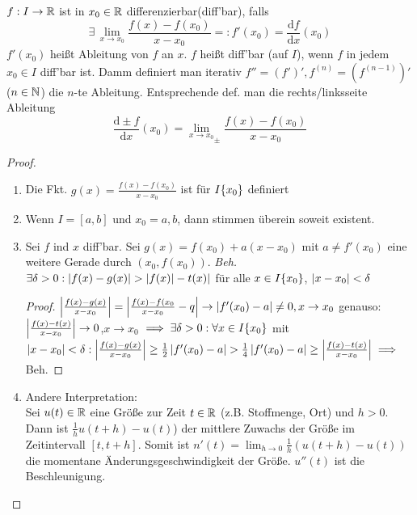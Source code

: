 \documentclass[12pt]{scrreprt}
\begin{document}
\begin{dfn}\label{dfn:diff.rechenregeln.diffbar} $f: I \rightarrow \mathbb{R}$ ist in $x_0 \in \mathbb{R}$ differenzierbar(diff'bar), falls
\begin{equation}\label{}
\exists\,\lim_{x\to x_0} \frac{f(x) - f(x_0)}{x-x_0} =: f'(x_0) = \frac{\mathrm{d} f}{\mathrm{d} x}(x_0) 
\end{equation}
$f'(x_0)$ heißt Ableitung von $f$ an $x$. $f$ heißt diff'bar (auf $I$), wenn $f$ in jedem $x_0 \in I$ diff'bar ist. Damm definiert man
iterativ $f'' = (f')', f^(n) = (f^(n-1))'$ ($n \in \mathbb{N}$) die $n$-te Ableitung.
Entsprechende def. man die rechts/linksseite Ableitung
\begin{equation}
\frac{\mathrm{d} \pm f}{\mathrm{d} x}(x_0) = {\lim_{x\to x_0}}_\pm \frac{f(x) - f(x_0)}{x-x_0}
\end{equation}
\end{dfn}

\begin{proof}
\begin{enumerate}
\item Die Fkt. $g(x) = \frac{f(x) - f(x_0)}{x-x_0}$ ist für $I\\\{x_0\}$ definiert
\item Wenn $I=[a,b]$ und $x_0=a,b$, dann stimmen %
überein soweit existent.
\item Sei $f$ ind $x$ diff'bar. Sei $g(x) = f(x_0) + a(x-x_0)$ mit $a \ne f'(x_0)$ eine weitere Gerade durch
$(x_0, f(x_0))$. \emph{Beh.} $\exists \delta > 0: \left\lvert f(x) - g(x)\right\lvert > \left\lvert f(x)\right\lvert-t(x)|$ für alle 
$x \in I\\\{x_0\} $, $\left\lvert x-x_0\right\lvert < \delta$
\begin{proof}
$\left\lvert\frac{f(x) - g(x)}{x-x_0}\right\lvert = \left\lvert\frac{f(x)-f(x_0}{x-x_0} - q\right\lvert \to \left\lvert f'(x_0)-a\right\lvert \ne 0, x\to x_0$
genauso: $\left\lvert\frac{f(x)-t(x)}{x-x_0}\right\lvert \to 0$,$x\to x_0$
$\implies \exists\delta>0:\forall x\in I\\\{x_0\}$ mit $\left\lvert x-x_0\right\lvert < \delta:\left\lvert\frac{f(x)-g(x)}{x-x_0}\right\lvert\ge
\frac{1}{2}\left\lvert f'(x_0) -a\right\lvert > \frac{1}{4}\left\lvert f'(x_0)-a\right\lvert\ge\left\lvert\frac{f(x)-t(x)}{x-x_0}\right\lvert \implies$ Beh.
\end{proof}
\item Andere Interpretation:\\
Sei $u(t) \in \mathbb{R}$ eine Größe zur Zeit $t\in\mathbb{R}$ (z.B. Stoffmenge, Ort) und $h>0$.
Dann ist $\frac{1}{h}u(t+h) - u(t)$) der mittlere Zuwachs der Größe im Zeitintervall $[t, t+h]$. Somit ist
$n'(t) = \lim_{h\to 0}\frac{1}{h}(u(t+h)-u(t))$ die momentane Änderungsgeschwindigkeit der Größe. $u''(t)$ ist die Beschleunigung.
\end{enumerate}
\end{proof}
\end{document}
